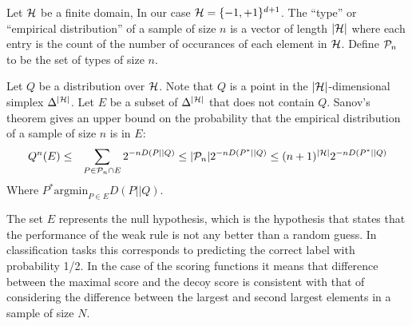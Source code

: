 \documentclass[11pt]{article}
\begin{document}
Let ${\cal H}$ be a finite domain, In our case ${\cal H}=\{-1,+1\}^{d+1}$.
The ``type'' or ``empirical distribution'' of a sample of size $n$ is 
a vector of length $|{\cal H}|$ where each entry is the count of the number
of occurances of each element in ${\cal H}$. Define ${\cal P}_n$ to be the set 
of types of size $n$. 

\newcommand{\simplex}{\Delta^{|\cH|}}
Let $Q$ be a distribution over ${\cal H}$. Note that $Q$ is a point in the
$|{\cal H}|$-dimensional simplex $\simplex$. Let $E$ be a subset of
$\simplex$ that does not contain $Q$. Sanov's theorem gives an upper
bound on the probability that the empirical distribution of a sample
of size $n$ is in $E$:
\begin{eqnarray*}
Q^n(E) & \leq & \sum_{P \in {\cal P}_n \cap E} 2^{-nD(P||Q)}
\leq |{\cal P}_n|  2^{-nD(P^*||Q)}
\leq (n+1)^{|{\cal H}|} 2^{-nD(P^*||Q)}
\end{eqnarray*}
Where $P^* \mbox{argmin}_{P \in E} D(P||Q)$.

The set $E$ represents the null hypothesis, which is the hypothesis
that states that the performance of the weak rule is not any better
than a random guess. In classification tasks this corresponds to
predicting the correct label with probability 1/2. In the case of the
scoring functions it means that difference between the maximal score
and the decoy score is consistent with that of considering the
difference between the largest and second largest elements in a sample
of size $N$.

\end{document}
